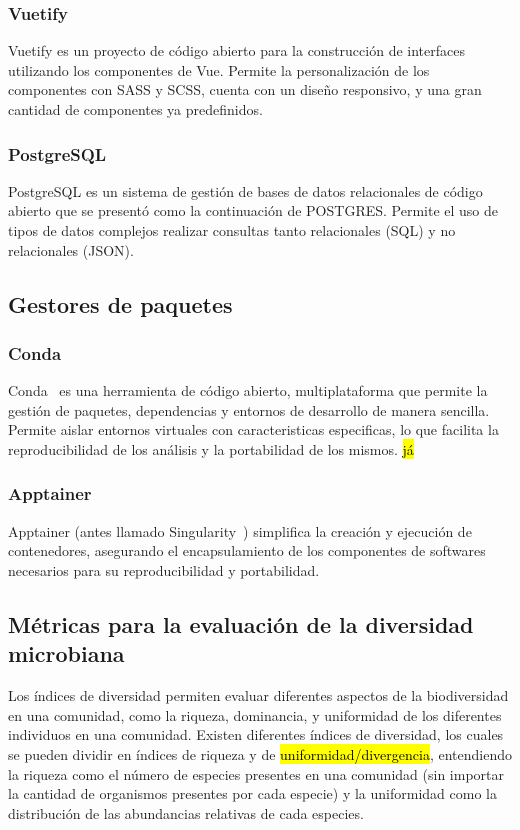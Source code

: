 \subsubsection{Vuetify}
Vuetify es un proyecto de código abierto para la construcción de interfaces utilizando los componentes de Vue. Permite la personalización de los componentes con SASS y SCSS, cuenta con un diseño responsivo, y una gran cantidad de componentes ya predefinidos.
\subsubsection{PostgreSQL}
PostgreSQL es un sistema de gestión de bases de datos relacionales de código abierto que se presentó como la continuación de POSTGRES. Permite el uso de tipos de datos complejos realizar consultas tanto relacionales (SQL) y no relacionales (JSON).

\subsection{Gestores de paquetes}
\subsubsection{Conda}
Conda~\cite{anaconda}  es una herramienta de código abierto, multiplataforma  que permite la gestión de paquetes, dependencias y entornos de desarrollo de manera sencilla. Permite aislar entornos virtuales con caracteristicas especificas, lo que facilita la reproducibilidad de los análisis y la portabilidad de los mismos. \hl{já}
\subsubsection{Apptainer}
Apptainer (antes llamado Singularity~\cite{kurtzer2017singularity}) simplifica la creación y ejecución de contenedores, asegurando el encapsulamiento de los componentes de softwares necesarios para su reproducibilidad y portabilidad.  

\subsection{Métricas para la evaluación de la diversidad microbiana}

Los índices de diversidad permiten evaluar diferentes aspectos de la biodiversidad en una comunidad, como la riqueza, dominancia, y uniformidad de los diferentes individuos en una comunidad. 
Existen diferentes índices de diversidad, los cuales se pueden dividir en índices de riqueza y de \hl{uniformidad/divergencia}, entendiendo la riqueza como el número de especies presentes en una comunidad (sin importar la cantidad de organismos presentes por cada especie) y la uniformidad como la distribución de las abundancias relativas de cada especies.

